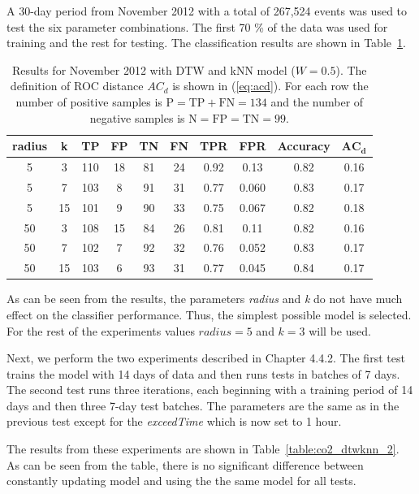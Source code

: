A 30-day period from November 2012 with a total of 267,524 events was used to test the six parameter combinations. The first 70 \% of the data was used for training and the rest for testing. The classification results are shown in Table~\ref{table:co2_dtwknn_1}.


\begin{table}
  \caption{Results for November 2012 with DTW and kNN model ($W = 0.5$). The definition of ROC distance $AC_d$ is shown in (\ref{eq:acd}). For each row the number of positive samples is $\text{P} = \text{TP} + \text{FN} = 134$ and the number of negative samples is $\text{N} = \text{FP} = \text{TN} = 99$.} 
  \begin{tabular}{ c | c | c | c | c | c | c | c | c | c }
    \hline
   	\textbf{radius} & \textbf{k} & \textbf{TP} & \textbf{FP} & \textbf{TN} & \textbf{FN} & \textbf{TPR} & \textbf{FPR} & \textbf{Accuracy} & $\mathbf{AC_d}$ \\
	\hline
	5 & 3 & 110 & 18 & 81 & 24 & 0.92 & 0.13 & 0.82 & 0.16 \\
	5 & 7 & 103 & 8 & 91 & 31 & 0.77 & 0.060 & 0.83 & 0.17 \\
	5 & 15 & 101 & 9 & 90 & 33 & 0.75 & 0.067 & 0.82 & 0.18 \\
	50 & 3 & 108 & 15 & 84 & 26 & 0.81 & 0.11 & 0.82 & 0.16 \\
	50 & 7 & 102 & 7 & 92 & 32 & 0.76 & 0.052 & 0.83 & 0.17 \\
	50 & 15 & 103 & 6 & 93 & 31 & 0.77 & 0.045 & 0.84 & 0.17 \\
	\hline
  \end{tabular}
  \label{table:co2_dtwknn_1}
\end{table}

As can be seen from the results, the parameters \emph{radius} and \emph{k} do not have much effect on the classifier performance. Thus, the simplest possible model is selected. For the rest of the experiments values $radius = 5$ and $k = 3$ will be used.

Next, we perform the two experiments described in Chapter 4.4.2. The first test trains the model with 14 days of data and then runs tests in batches of 7 days. The second test runs three iterations, each beginning with a training period of 14 days and then three 7-day test batches. The parameters are the same as in the previous test except for the \emph{exceedTime} which is now set to 1 hour.

The results from these experiments are shown in Table~\ref{table:co2_dtwknn_2}. As can be seen from the table, there is no significant difference between constantly updating model and using the the same model for all tests.


